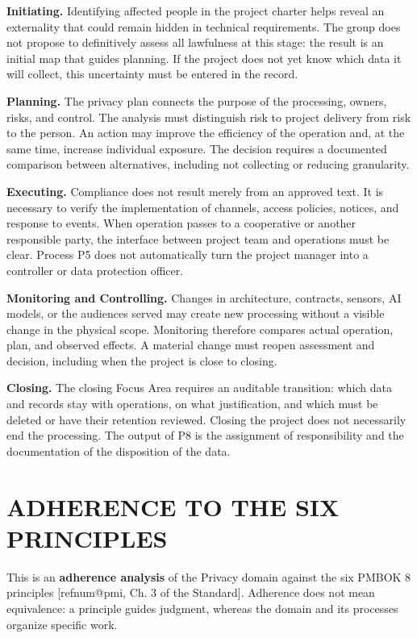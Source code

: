 \documentclass[12pt,a4paper,article,oneside,brazil,english]{abntex2}
\makeatletter
\newcommand{\refnum}[1]{\csname refnum@#1\endcsname}
\makeatother
\begin{document}
\textbf{Initiating.} Identifying affected people in the project charter helps reveal an externality that could remain hidden in technical requirements. The group does not propose to definitively assess all lawfulness at this stage: the result is an initial map that guides planning. If the project does not yet know which data it will collect, this uncertainty must be entered in the record.

\textbf{Planning.} The privacy plan connects the purpose of the processing, owners, risks, and control. The analysis must distinguish risk to project delivery from risk to the person. An action may improve the efficiency of the operation and, at the same time, increase individual exposure. The decision requires a documented comparison between alternatives, including not collecting or reducing granularity.

\textbf{Executing.} Compliance does not result merely from an approved text. It is necessary to verify the implementation of channels, access policies, notices, and response to events. When operation passes to a cooperative or another responsible party, the interface between project team and operations must be clear. Process P5 does not automatically turn the project manager into a controller or data protection officer.

\textbf{Monitoring and Controlling.} Changes in architecture, contracts, sensors, AI models, or the audiences served may create new processing without a visible change in the physical scope. Monitoring therefore compares actual operation, plan, and observed effects. A material change must reopen assessment and decision, including when the project is close to closing.

\textbf{Closing.} The closing Focus Area requires an auditable transition: which data and records stay with operations, on what justification, and which must be deleted or have their retention reviewed. Closing the project does not necessarily end the processing. The output of P8 is the assignment of responsibility and the documentation of the disposition of the data.

\section{ADHERENCE TO THE SIX PRINCIPLES}

This is an \textbf{adherence analysis} of the Privacy domain against the six PMBOK 8 principles [\refnum{pmi}, Ch. 3 of the Standard]. Adherence does not mean equivalence: a principle guides judgment, whereas the domain and its processes organize specific work.
\end{document}

